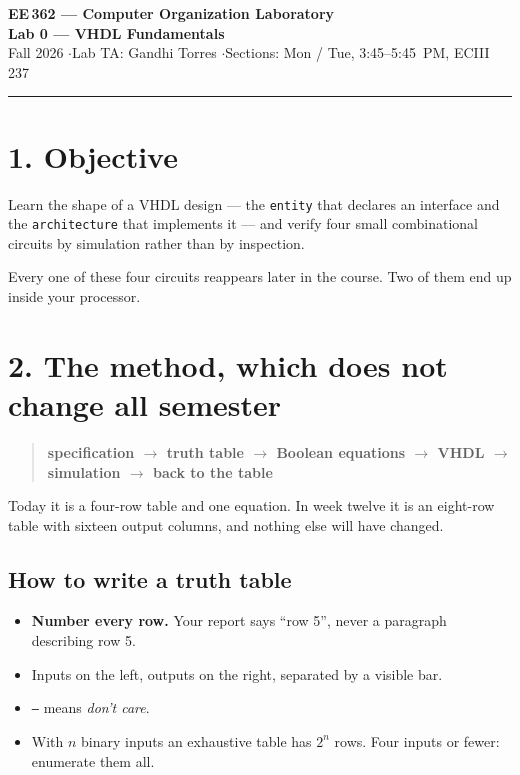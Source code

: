 \documentclass[11pt]{article}
\newcommand{\code}[1]{\texttt{#1}}
\newcommand{\hr}{\vspace{2pt}\hrule\vspace{6pt}}
\begin{document}
\begin{center}
{\Large\bfseries EE\,362 --- Computer Organization Laboratory}\\[2pt]
{\large\bfseries Lab 0 --- VHDL Fundamentals}\\[4pt]
Fall 2026 \quad$\cdot$\quad Lab TA: Gandhi Torres \quad$\cdot$\quad Sections: Mon / Tue, 3:45--5:45~PM, ECIII 237
\end{center}
\hr

\section*{1. Objective}

Learn the shape of a VHDL design --- the \code{entity} that declares an interface
and the \code{architecture} that implements it --- and verify four small
combinational circuits by simulation rather than by inspection.

Every one of these four circuits reappears later in the course. Two of them end up
inside your processor.

\section*{2. The method, which does not change all semester}

\begin{quote}
\textbf{specification $\rightarrow$ truth table $\rightarrow$ Boolean equations
$\rightarrow$ VHDL $\rightarrow$ simulation $\rightarrow$ back to the table}
\end{quote}

Today it is a four-row table and one equation. In week twelve it is an eight-row
table with sixteen output columns, and nothing else will have changed.

\subsection*{How to write a truth table}

\begin{itemize}[leftmargin=1.6em,itemsep=1pt]
\item \textbf{Number every row.} Your report says ``row 5'', never a paragraph
describing row 5.
\item Inputs on the left, outputs on the right, separated by a visible bar.
\item \code{--} means \emph{don't care}.
\item With $n$ binary inputs an exhaustive table has $2^n$ rows. Four inputs or
fewer: enumerate them all.
\end{itemize}
\end{document}
